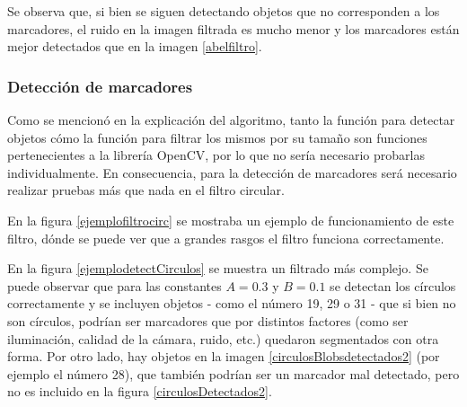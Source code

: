 Se observa que, si bien se siguen detectando objetos que no corresponden a los marcadores, el ruido en la imagen filtrada es mucho menor y los marcadores están mejor detectados que en la imagen \ref{abelfiltro}.

\subsubsection{Detección de marcadores}

Como se mencionó en la explicación del algoritmo, tanto la función para detectar objetos cómo la función para filtrar los mismos por su tamaño son funciones pertenecientes a la librería OpenCV\cite{opencv}, por lo que no sería necesario probarlas individualmente. En consecuencia, para la detección de marcadores será necesario realizar pruebas más que nada en el filtro circular.

En la figura \ref{ejemplofiltrocirc} se mostraba un ejemplo de funcionamiento de este filtro, dónde se puede ver que a grandes rasgos el filtro funciona correctamente. 

En la figura \ref{ejemplodetectCirculos} se muestra un filtrado más complejo. Se puede observar que para las constantes $A=0.3$ y $B=0.1$ se detectan los círculos correctamente y se incluyen objetos - como el número 19, 29 o 31 - que si bien no son círculos, podrían ser marcadores que por distintos factores (como ser iluminación, calidad de la cámara, ruido, etc.) quedaron segmentados con otra forma. Por otro lado, hay objetos en la imagen \ref{circulosBlobsdetectados2} (por ejemplo el número 28), que también podrían ser un marcador mal detectado, pero no es incluido en la figura \ref{circulosDetectados2}.


